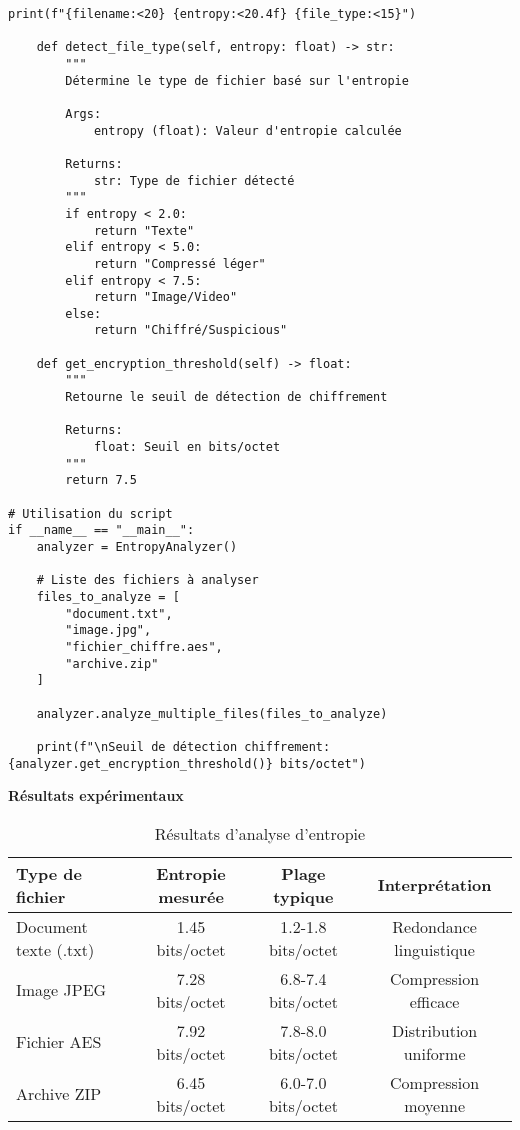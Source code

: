 \documentclass[12pt,a4paper]{article}
\begin{document}
\begin{lstlisting}[caption=Script Python complet pour le calcul d'entropie]
                print(f"{filename:<20} {entropy:<20.4f} {file_type:<15}")
    
    def detect_file_type(self, entropy: float) -> str:
        """
        Détermine le type de fichier basé sur l'entropie
        
        Args:
            entropy (float): Valeur d'entropie calculée
            
        Returns:
            str: Type de fichier détecté
        """
        if entropy < 2.0:
            return "Texte"
        elif entropy < 5.0:
            return "Compressé léger"
        elif entropy < 7.5:
            return "Image/Video"
        else:
            return "Chiffré/Suspicious"
    
    def get_encryption_threshold(self) -> float:
        """
        Retourne le seuil de détection de chiffrement
        
        Returns:
            float: Seuil en bits/octet
        """
        return 7.5

# Utilisation du script
if __name__ == "__main__":
    analyzer = EntropyAnalyzer()
    
    # Liste des fichiers à analyser
    files_to_analyze = [
        "document.txt",
        "image.jpg", 
        "fichier_chiffre.aes",
        "archive.zip"
    ]
    
    analyzer.analyze_multiple_files(files_to_analyze)
    
    print(f"\nSeuil de détection chiffrement: {analyzer.get_encryption_threshold()} bits/octet")
\end{lstlisting}

\textbf{Résultats expérimentaux}

\begin{table}[H]
\centering
\begin{tabular}{|l|c|c|c|}
\hline
\textbf{Type de fichier} & \textbf{Entropie mesurée} & \textbf{Plage typique} & \textbf{Interprétation} \\
\hline
Document texte (.txt) & 1.45 bits/octet & 1.2-1.8 bits/octet & Redondance linguistique \\
\hline
Image JPEG & 7.28 bits/octet & 6.8-7.4 bits/octet & Compression efficace \\
\hline
Fichier AES & 7.92 bits/octet & 7.8-8.0 bits/octet & Distribution uniforme \\
\hline
Archive ZIP & 6.45 bits/octet & 6.0-7.0 bits/octet & Compression moyenne \\
\hline
\end{tabular}
\caption{Résultats d'analyse d'entropie}
\end{table}
\end{document}
